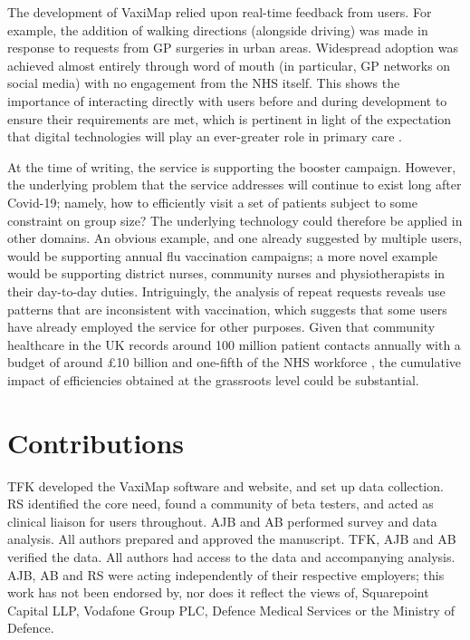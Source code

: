 \documentclass[review]{elsarticle}
\def\vm{VaxiMap}
\begin{document}
The development of \vm{} relied upon real-time feedback from users. For example, the addition of walking directions (alongside driving) was made in response to requests from GP surgeries in urban areas. Widespread adoption was achieved almost entirely through word of mouth (in particular, GP networks on social media) with no engagement from the NHS itself. This shows the importance of interacting directly with users before and during development to ensure their requirements are met, which is pertinent in light of the expectation that digital technologies will play an ever-greater role in primary care \cite{WorldHealthOrganizationWHO2018}. 

At the time of writing, the service is supporting the booster campaign. However, the underlying problem that the service addresses will continue to exist long after Covid-19; namely, how to efficiently visit a set of patients subject to some constraint on group size? The underlying technology could therefore be applied in other domains. An obvious example, and one already suggested by multiple users, would be supporting annual flu vaccination campaigns; a more novel example would be supporting district nurses, community nurses and physiotherapists in their day-to-day duties. Intriguingly, the analysis of repeat requests reveals use patterns that are inconsistent with vaccination, which suggests that some users have already employed the service for other purposes. Given that community healthcare in the UK records around 100 million patient contacts annually with a budget of around £10 billion and one-fifth of the NHS workforce \cite{Fund2019}, the cumulative impact of efficiencies obtained at the grassroots level could be substantial. 

\section{Contributions}

TFK developed the \vm{} software and website, and set up data collection. RS identified the core need, found a community of beta testers, and acted as clinical liaison for users throughout. AJB and AB performed survey and data analysis. All authors prepared and approved the manuscript. TFK, AJB and AB verified the data. All authors had access to the data and accompanying analysis. AJB, AB and RS were acting independently of their respective employers; this work has not been endorsed by, nor does it reflect the views of, Squarepoint Capital LLP, Vodafone Group PLC, Defence Medical Services or the Ministry of Defence. 
\end{document}
